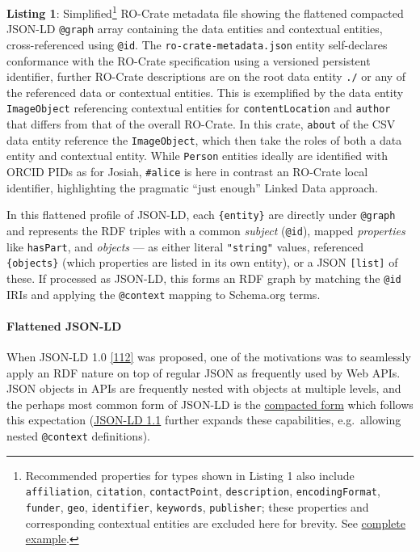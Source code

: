 {\textbf{Listing 1}: Simplified\footnote{Recommended properties for types
  shown in Listing 1 also include \texttt{affiliation},
  \texttt{citation}, \texttt{contactPoint}, \texttt{description},
  \texttt{encodingFormat}, \texttt{funder}, \texttt{geo},
  \texttt{identifier}, \texttt{keywords}, \texttt{publisher}; these
  properties and corresponding contextual entities are excluded here for
  brevity. See
  \href{https://www.researchobject.org/2021-packaging-research-artefacts-with-ro-crate/listing1/}{complete
  example}.} RO-Crate metadata file showing the flattened compacted
JSON-LD \texttt{@graph} array containing the data entities and
contextual entities, cross-referenced using \texttt{@id}. The
\texttt{ro-crate-metadata.json} entity self-declares conformance with
the RO-Crate specification using a versioned persistent identifier,
further RO-Crate descriptions are on the root data entity \texttt{./} or
any of the referenced data or contextual entities. This is exemplified
by the data entity \texttt{ImageObject} referencing contextual entities
for \texttt{contentLocation} and \texttt{author} that differs from that
of the overall RO-Crate. In this crate, \texttt{about} of the CSV data
entity reference the \texttt{ImageObject}, which then take the roles of
both a data entity and contextual entity. While \texttt{Person} entities
ideally are identified with ORCID PIDs as for Josiah, \texttt{\#alice}
is here in contrast an RO-Crate local identifier, highlighting the
pragmatic ``just enough'' Linked Data approach. \normalsize

In this flattened profile of JSON-LD, each \texttt{\{entity\}} are
directly under \texttt{@graph} and represents the RDF triples with a
common \emph{subject} (\texttt{@id}), mapped \emph{properties} like
\texttt{hasPart}, and \emph{objects} --- as either literal
\texttt{"string"} values, referenced \texttt{\{objects\}} (which
properties are listed in its own entity), or a JSON \texttt{{[}list{]}}
of these. If processed as JSON-LD, this forms an RDF graph by matching
the \texttt{@id} IRIs and applying the \texttt{@context} mapping to
Schema.org terms. \normalsize

\hypertarget{flattened-json-ld}{%
\paragraph{Flattened JSON-LD}\label{flattened-json-ld}}

When JSON-LD 1.0
\href{https://www.w3.org/TR/2014/REC-json-ld-20140116/}{{[}112{]}} was
proposed, one of the motivations was to seamlessly apply an RDF nature
on top of regular JSON as frequently used by Web APIs. JSON objects in
APIs are frequently nested with objects at multiple levels, and the
perhaps most common form of JSON-LD is the
\href{https://json-ld.org/spec/REC/json-ld/20140116/\#compacted-document-form}{compacted
form} which follows this expectation
(\href{https://www.w3.org/TR/2020/REC-json-ld11-20200716/}{JSON-LD 1.1}
further expands these capabilities, e.g.~allowing nested
\texttt{@context} definitions).

}
